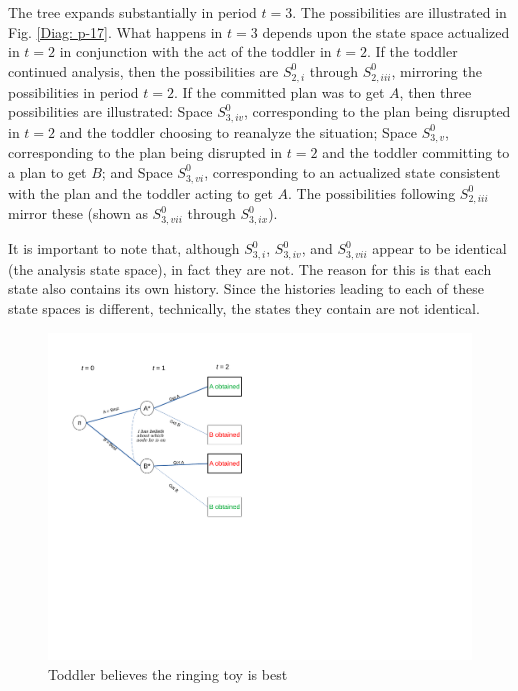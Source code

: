 \documentclass[
11pt,
titlepage,
reqno,
]{article}%
\theoremstyle{definition}
\begin{document}
The tree expands substantially in period $t=3$. The possibilities are illustrated in Fig. \ref{Diag: p-17}. What happens in $t=3$ depends upon the state space actualized in $t=2$ in conjunction with the act of the toddler in $t=2$. If the toddler continued analysis, then the possibilities are $S^0_{2,i}$ through $S^0_{2,iii}$, mirroring the possibilities in period $t=2$. If the committed plan was to get $A$, then three possibilities are illustrated: Space $S^0_{3,iv}$, corresponding to the plan being disrupted in $t=2$ and the toddler choosing to reanalyze the situation; Space $S^0_{3,v}$, corresponding to the plan being disrupted in $t=2$ and the toddler committing to a plan to get $B$; and Space $S^0_{3,vi}$, corresponding to an actualized state consistent with the plan and the toddler acting to get $A$. The possibilities following $S^0_{2,iii}$ mirror these (shown as $S^0_{3,vii}$ through $S^0_{3,ix}$).

It is important to note that, although $S^0_{3,i}$, $S^0_{3,iv}$, and $S^0_{3,vii}$ appear to be identical (the analysis state space), in fact they are not. The reason for this is that each state also contains its own history. Since the histories leading to each of these state spaces is different, technically, the states they contain are not identical.



\begin{figure}[h!]
	\centering
	\includegraphics*[page=18,trim = 0in 5in 1.5in 0in,scale=.7]{Awareness_Diagrams_All}
	\caption{Toddler believes the ringing toy is best\label{Diag: p-18}}%
\end{figure}
\end{document}
